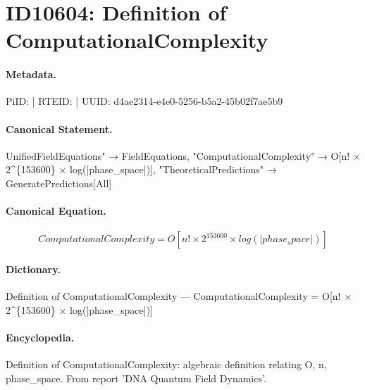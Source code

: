 \section*{ID10604: Definition of ComputationalComplexity}
\paragraph{Metadata.}
PiID:  | RTEID:  | UUID: d4ae2314-e4e0-5256-b5a2-45b02f7ae5b9

\paragraph{Canonical Statement.}
UnifiedFieldEquations" → FieldEquations, "ComputationalComplexity" → O[n! × 2\textasciicircum{}\{153600\} × log(|phase\_space|)], "TheoreticalPredictions" → GeneratePredictions[All]

\paragraph{Canonical Equation.}
\[
ComputationalComplexity = O[n! × 2^{153600} × log(|phase_space|)]
\]

\paragraph{Dictionary.}
Definition of ComputationalComplexity — ComputationalComplexity = O[n! × 2\textasciicircum{}\{153600\} × log(|phase\_space|)]

\paragraph{Encyclopedia.}
Definition of ComputationalComplexity: algebraic definition relating O, n, phase\_space. From report 'DNA Quantum Field Dynamics'.
